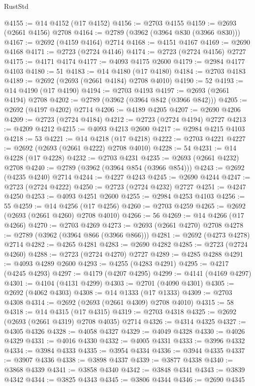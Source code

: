 \begin{lexlean}{RustStd}
\begin{coremodule}
@4155 := @14 @4152 (@17 @4152)
@4156 := @2703 @4155
@4159 := @2693 (@2661 @4156) @2708
@4164 := @2789 (@3962 (@3964 @830 (@3966 @830)))
@4167 := @2692 (@4159 @4164) @2714
@4168 := @4151 @4167
@4169 := @2690 @4168
@4171 := @2723 (@2724 @4146)
@4174 := @2723 (@2724 @4156) @2727
@4175 := @4171 @4174
@4177 := @4093 @4175 @2600
@4179 := @2984 @4177 @4103
@4180 := 51
@4183 := @14 @4180 (@17 @4180)
@4184 := @2703 @4183
@4189 := @2692 (@2693 (@2661 @4184) @2708 @4010)
@4190 := 52
@4193 := @14 @4190 (@17 @4190)
@4194 := @2703 @4193
@4197 := @2693 (@2661 @4194) @2708
@4202 := @2789 (@3962 (@3964 @842 (@3966 @842)))
@4205 := @2692 (@4197 @4202) @2714
@4206 := @4189 @4205
@4207 := @2690 @4206
@4209 := @2723 (@2724 @4184)
@4212 := @2723 (@2724 @4194) @2727
@4213 := @4209 @4212
@4215 := @4093 @4213 @2600
@4217 := @2984 @4215 @4103
@4218 := 53
@4221 := @14 @4218 (@17 @4218)
@4222 := @2703 @4221
@4227 := @2692 (@2693 (@2661 @4222) @2708 @4010)
@4228 := 54
@4231 := @14 @4228 (@17 @4228)
@4232 := @2703 @4231
@4235 := @2693 (@2661 @4232) @2708
@4240 := @2789 (@3962 (@3964 @854 (@3966 @854)))
@4243 := @2692 (@4235 @4240) @2714
@4244 := @4227 @4243
@4245 := @2690 @4244
@4247 := @2723 (@2724 @4222)
@4250 := @2723 (@2724 @4232) @2727
@4251 := @4247 @4250
@4253 := @4093 @4251 @2600
@4255 := @2984 @4253 @4103
@4256 := 55
@4259 := @14 @4256 (@17 @4256)
@4260 := @2703 @4259
@4265 := @2692 (@2693 (@2661 @4260) @2708 @4010)
@4266 := 56
@4269 := @14 @4266 (@17 @4266)
@4270 := @2703 @4269
@4273 := @2693 (@2661 @4270) @2708
@4278 := @2789 (@3962 (@3964 @866 (@3966 @866)))
@4281 := @2692 (@4273 @4278) @2714
@4282 := @4265 @4281
@4283 := @2690 @4282
@4285 := @2723 (@2724 @4260)
@4288 := @2723 (@2724 @4270) @2727
@4289 := @4285 @4288
@4291 := @4093 @4289 @2600
@4293 := @4255 (@4283 @4291)
@4295 := @4217 (@4245 @4293)
@4297 := @4179 (@4207 @4295)
@4299 := @4141 (@4169 @4297)
@4301 := @4104 (@4131 @4299)
@4303 := @2701 (@4090 @4301)
@4305 := @2692 (@4062 @4303)
@4308 := @14 @1333 (@17 @1333)
@4309 := @2703 @4308
@4314 := @2692 (@2693 (@2661 @4309) @2708 @4010)
@4315 := 58
@4318 := @14 @4315 (@17 @4315)
@4319 := @2703 @4318
@4325 := @2692 (@2693 (@2661 @4319) @2708 @4035) @2714
@4326 := @4314 @4325
@4327 := @4305 @4326
@4328 := @4058 @4327
@4329 := @4049 @4328
@4330 := @4026 @4329
@4331 := @4016 @4330
@4332 := @4005 @4331
@4333 := @3996 @4332
@4334 := @3984 @4333
@4335 := @3954 @4334
@4336 := @3944 @4335
@4337 := @3907 @4336
@4338 := @3898 @4337
@4339 := @3877 @4338
@4340 := @3868 @4339
@4341 := @3858 @4340
@4342 := @3848 @4341
@4343 := @3839 @4342
@4344 := @3825 @4343
@4345 := @3806 @4344
@4346 := @2690 @4345

\end{coremodule}
\end{lexlean}
